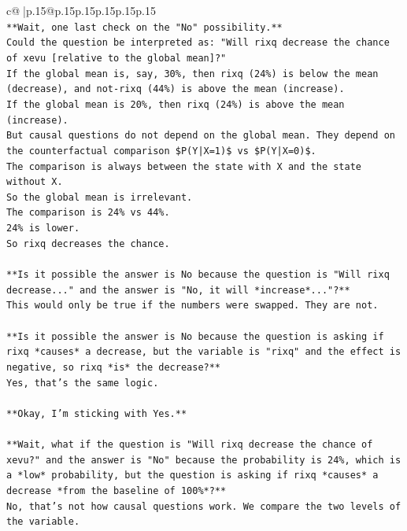 \documentclass{article}
\begin{document}
{\begin{supertabular}{c@{$\;$}|p{.15\linewidth}@{}p{.15\linewidth}p{.15\linewidth}p{.15\linewidth}p{.15\linewidth}p{.15\linewidth}}
{{{\\ 
\texttt{**Wait, one last check on the "No" possibility.**} \\
\texttt{Could the question be interpreted as: "Will rixq decrease the chance of xevu {[}relative to the global mean{]}?"} \\
\texttt{If the global mean is, say, 30\%, then rixq (24\%) is below the mean (decrease), and not{-}rixq (44\%) is above the mean (increase).} \\
\texttt{If the global mean is 20\%, then rixq (24\%) is above the mean (increase).} \\
\texttt{But causal questions do not depend on the global mean. They depend on the counterfactual comparison \$P(Y|X=1)\$ vs \$P(Y|X=0)\$.} \\
\texttt{The comparison is always between the state with X and the state without X.} \\
\texttt{So the global mean is irrelevant.} \\
\texttt{The comparison is 24\% vs 44\%.} \\
\texttt{24\% is lower.} \\
\texttt{So rixq decreases the chance.} \\
\\ 
\texttt{**Is it possible the answer is No because the question is "Will rixq decrease..." and the answer is "No, it will *increase*..."?**} \\
\texttt{This would only be true if the numbers were swapped. They are not.} \\
\\ 
\texttt{**Is it possible the answer is No because the question is asking if rixq *causes* a decrease, but the variable is "rixq" and the effect is negative, so rixq *is* the decrease?**} \\
\texttt{Yes, that's the same logic.} \\
\\ 
\texttt{**Okay, I'm sticking with Yes.**} \\
\\ 
\texttt{**Wait, what if the question is "Will rixq decrease the chance of xevu?" and the answer is "No" because the probability is 24\%, which is a *low* probability, but the question is asking if rixq *causes* a decrease *from the baseline of 100\%*?**} \\
\texttt{No, that's not how causal questions work. We compare the two levels of the variable.} \\
\\ 
}}}
\end{supertabular}}
\end{document}
